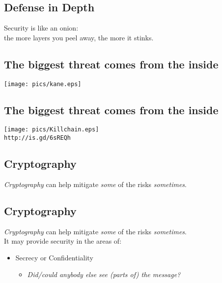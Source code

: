 \documentclass[xga]{xdvislides}
\begin{document}
\subsection{Defense in Depth}
\vspace*{\fill}
\Huge
\begin{center}
	Security is like an onion: \\
	the more layers you peel away, the more it stinks.
\end{center}
\Normalsize
\vspace*{\fill}

\subsection{The biggest threat comes from the inside}
\vspace*{\fill}
\begin{center}
	\texttt{[image: pics/kane.eps]}
\end{center}
\vspace*{\fill}

\subsection{The biggest threat comes from the inside}
\vspace*{\fill}
\begin{center}
	\texttt{[image: pics/Killchain.eps]} \\
	\verb+http://is.gd/6sREQh+
\end{center}
\vspace*{\fill}

\subsection{Cryptography}
\Normalsize
{\em Cryptography} can help mitigate {\em some} of the risks {\em sometimes}.

\subsection{Cryptography}
{\em Cryptography} can help mitigate {\em some} of the risks {\em sometimes}.
\\

It may provide security in the areas of:
\begin{itemize}
	\item Secrecy or Confidentiality
		\begin{itemize}
			\item {\em Did/could anybody else see (parts of) the message?}
		\end{itemize}
\end{itemize}
\end{document}
